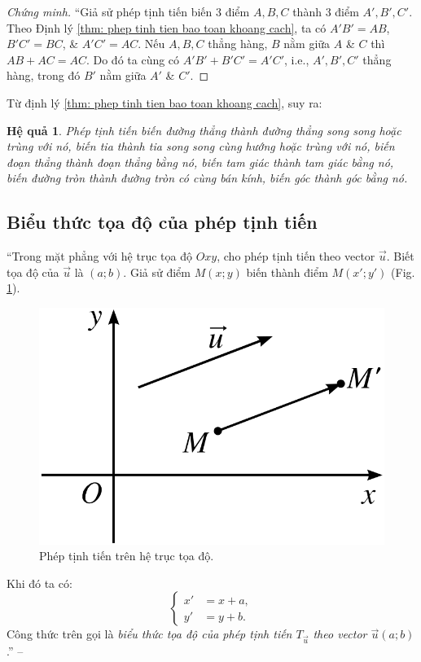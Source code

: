 \documentclass[oneside]{book}
\numberwithin{equation}{section}
\newtheorem{hequa}{Hệ quả}[section]
\begin{document}
\begin{proof}[Chứng minh]
	``Giả sử phép tịnh tiến biến 3 điểm $A,B,C$ thành 3 điểm $A',B',C'$. Theo Định lý \ref{thm: phep tinh tien bao toan khoang cach}, ta có $A'B' = AB$, $B'C' = BC$, \& $A'C' = AC$. Nếu $A,B,C$ thẳng hàng, $B$ nằm giữa $A$ \& $C$ thì $AB + AC = AC$. Do đó ta cùng có $A'B' + B'C' = A'C'$, i.e., $A',B',C'$ thẳng hàng, trong đó $B'$ nằm giữa $A'$ \& $C'$.
\end{proof}
Từ định lý \ref{thm: phep tinh tien bao toan khoang cach}, suy ra:

\begin{hequa}
	\label{cor:phep tinh tien}
	Phép tịnh tiến biến đường thẳng thành đường thẳng song song hoặc trùng với nó, biến tia thành tia song song cùng hướng hoặc trùng với nó, biến đoạn thẳng thành đoạn thẳng bằng nó, biến tam giác thành tam giác bằng nó, biến đường tròn thành đường tròn có cùng bán kính, biến góc thành góc bằng nó.
\end{hequa}

\subsection{Biểu thức tọa độ của phép tịnh tiến}
``Trong mặt phẳng với hệ trục tọa độ $Oxy$, cho phép tịnh tiến theo vector $\vec{u}$. Biết tọa độ của $\vec{u}$ là $(a;b)$. Giả sử điểm $M(x;y)$ biến thành điểm $M(x';y')$ (Fig. \ref{fig:phep tinh tien tren he truc toa do}).

\begin{figure}[H]
	\centering
	\includegraphics[scale=0.15]{phep_tinh_tien_tren_he_truc_toa_do}
	\caption{Phép tịnh tiến trên hệ trục tọa độ.}
	\label{fig:phep tinh tien tren he truc toa do}
\end{figure}
Khi đó ta có:
\begin{equation*}
	\boxed{\left\{\begin{split}
		x' &= x + a,\\
		y' &= y + b.
	\end{split}\right.}
\end{equation*}
Công thức trên gọi là \textit{biểu thức tọa độ của phép tịnh tiến $T_{\vec{u}}$ theo vector $\vec{u}(a;b)$}.'' -- \cite[pp. 6--7]{SGK_Toan_11_hinh_hoc_nang_cao}
\end{document}
